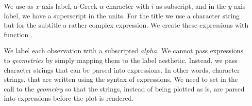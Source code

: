\documentclass[krantz2]{krantz}\usepackage{knitr}
\begin{document}
\begin{knitrout}\footnotesize
{}\color{fgcolor}\begin{kframe}
\begin{alltt}
\hlstd{(}\hlstd{)} 
 \hlkwb{<-}
  \hlstd{(} \hlstd{=} \hlopt{:}\hlstd{,}
              \hlstd{=} \hlstd{(}\hlstd{),}
              \hlstd{=} \hlstd{(}\hlstr{"alpha["}\hlstd{,} \hlopt{:}\hlstd{,} \hlstr{"]"}\hlstd{,}  \hlstd{=} \hlstd{))}
\end{alltt}
\end{kframe}
\end{knitrout}

We use as $x$-axis label, a Greek $\alpha$ character with $i$ as subscript, and in the $y$-axis label, we have a superscript in the units. For the title we use a character string but for the subtitle a rather complex expression. We create these expressions with function .

We label each observation with a subscripted $alpha$. We cannot pass expressions to \emph{geometries} by simply mapping them to the label aesthetic. Instead, we pass character strings that can be parsed into expressions. In other words, character strings, that are written using the syntax of expressions. We need to set  in the call to the \emph{geometry} so that the strings, instead of being plotted as is, are parsed into expressions before the plot is rendered.
\end{document}
